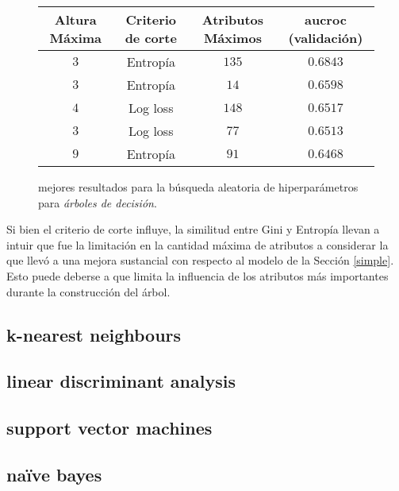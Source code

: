 \vspace{0.5em}
\begin{figure}[!htbp]
    \begin{center}
        \begin{tabular}{ |c|c|c|c| } 
         \hline
        Altura Máxima   & Criterio de corte & Atributos Máximos  & aucroc (validación) \\
        \hline
        $3$             & Entropía          &  $135$            & $0.6843$  \\ 
        $3$             & Entropía          &  $14$             & $0.6598$  \\
        $4$             & Log loss          &  $148$            & $0.6517$  \\ 
        $3$             & Log loss          &  $77$             & $0.6513$  \\
        $9$             & Entropía          &  $91$             & $0.6468$  \\ 
        \hline
        \end{tabular}
    \end{center}
    \caption{mejores resultados para la búsqueda aleatoria de hiperparámetros para \textit{árboles de decisión}.} \label{random_tree}
\end{figure}

Si bien el criterio de corte influye, la similitud entre Gini y Entropía llevan a intuir que fue la limitación en la cantidad máxima de atributos a considerar la que llevó a una mejora sustancial con respecto al modelo de la Sección \ref{simple}. Esto puede deberse a que limita la influencia de los atributos más importantes durante la construcción del árbol.

\subsection{k-nearest neighbours}
\subsection{linear discriminant analysis}
\subsection{support vector machines}
\subsection{naïve bayes}